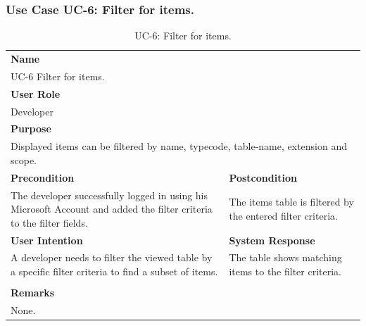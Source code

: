 \subsubsection{Use Case UC-6: Filter for items.}\label{subsubsec:use-case-uc-5:-filter-for-items}

\begin{table}[H]
    \centering
    \begin{tabular}{|p{}|p{}|}

        \hline
        \multicolumn{2}{|l|}{\rowcolor{gray!50}\textbf{Name}} \\
        \multicolumn{2}{|l|}{UC-6 Filter for items.} \\ \hline

        \multicolumn{2}{|l|}{\rowcolor{gray!50}\textbf{User Role}} \\
        \multicolumn{2}{|l|}{Developer} \\ \hline

        \multicolumn{2}{|l|}{\rowcolor{gray!50}\textbf{Purpose}} \\
        \multicolumn{2}{|l|}{Displayed items can be filtered by name, typecode, table-name, extension and scope.} \\ \hline

        \rowcolor{gray!50}\textbf{Precondition} & \rowcolor{gray!50}\textbf{Postcondition} \\
        The developer successfully logged in using his Microsoft Account and added the filter criteria to the filter fields.
        &
        The items table is filtered by the entered filter criteria.\\ \hline

        \rowcolor{gray!50}\textbf{User Intention} & \rowcolor{gray!50}\textbf{System Response} \\
        A developer needs to filter the viewed table by a specific filter criteria  to find a subset of items.
        &
        The table shows matching items to the filter criteria. \\ \hline

        & \\ \hline

        \multicolumn{2}{|l|}{\rowcolor{gray!50}\textbf{Remarks}} \\
        \multicolumn{2}{|p{1\textwidth}|}{None.} \\ \hline
    \end{tabular}
    \caption{UC-6: Filter for items.}
    \label{tab:uc-filter-for-items}
\end{table}

